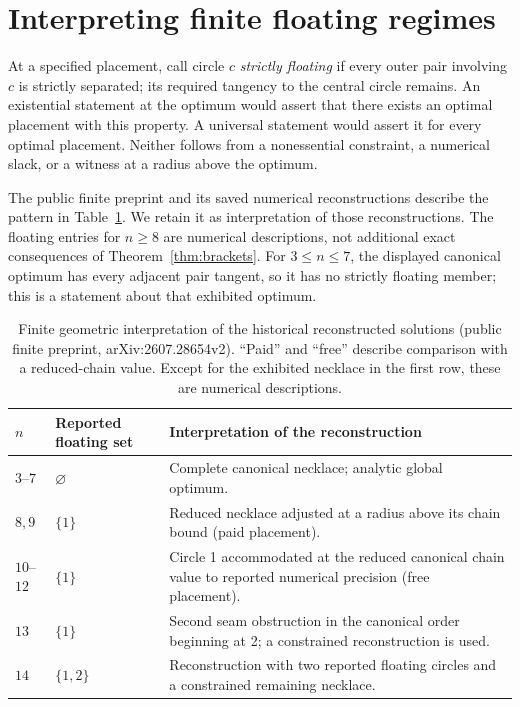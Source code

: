 \documentclass[11pt]{article}
\theoremstyle{definition}
\theoremstyle{remark}
\begin{document}
\section{Interpreting finite floating regimes}\label{sec:floating}
At a specified placement, call circle $c$ \emph{strictly floating} if
every outer pair involving $c$ is strictly separated; its required tangency
to the central circle remains. An existential statement at the optimum
would assert that there exists an optimal placement with this property.
A universal statement would assert it for every optimal placement. Neither
follows from a nonessential constraint, a numerical slack, or a witness
at a radius above the optimum.

The public finite preprint and its saved numerical reconstructions describe
the pattern in Table~\ref{tab:regimes}. We retain it as interpretation of
those reconstructions. The floating entries for $n\ge8$ are numerical
descriptions, not additional exact consequences of Theorem~\ref{thm:brackets}.
For $3\le n\le7$, the displayed canonical optimum has every adjacent
pair tangent, so it has no strictly floating member; this is a statement
about that exhibited optimum.

\begin{table}[htbp]\centering\small
\caption{Finite geometric interpretation of the historical reconstructed
solutions (public finite preprint, arXiv:2607.28654v2). ``Paid'' and ``free''
describe comparison with a reduced-chain value. Except for the exhibited
necklace in the first row, these are numerical descriptions.}
\label{tab:regimes}
\begin{tabularx}{\textwidth}{llX}\toprule
$n$ & Reported floating set & Interpretation of the reconstruction\\\midrule
$3$--$7$ & $\varnothing$ & Complete canonical necklace; analytic global optimum.\\
$8,9$ & $\{1\}$ & Reduced necklace adjusted at a radius above its chain bound (paid placement).\\
$10$--$12$ & $\{1\}$ & Circle 1 accommodated at the reduced canonical chain value to reported numerical precision (free placement).\\
$13$ & $\{1\}$ & Second seam obstruction in the canonical order beginning at 2; a constrained reconstruction is used.\\
$14$ & $\{1,2\}$ & Reconstruction with two reported floating circles and a constrained remaining necklace.\\\bottomrule
\end{tabularx}
\end{table}
\end{document}
